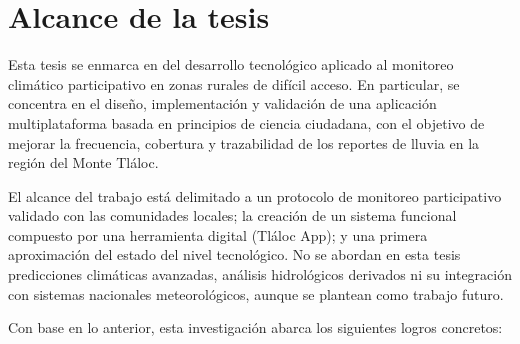 
\section{Alcance de la tesis}

Esta tesis se enmarca en del desarrollo tecnológico aplicado al monitoreo climático participativo en zonas rurales de difícil acceso. En particular, se concentra en el diseño, implementación y validación de una aplicación multiplataforma basada en principios de ciencia ciudadana, con el objetivo de mejorar la frecuencia, cobertura y trazabilidad de los reportes de lluvia en la región del Monte Tláloc.

El alcance del trabajo está delimitado a un protocolo de monitoreo participativo validado con las comunidades locales; la creación de un sistema funcional compuesto por una herramienta digital (Tláloc App); y una primera aproximación del estado del nivel tecnológico. No se abordan en esta tesis predicciones climáticas avanzadas, análisis hidrológicos derivados ni su integración con sistemas nacionales meteorológicos, aunque se plantean como trabajo futuro.

Con base en lo anterior, esta investigación abarca los siguientes logros concretos:

